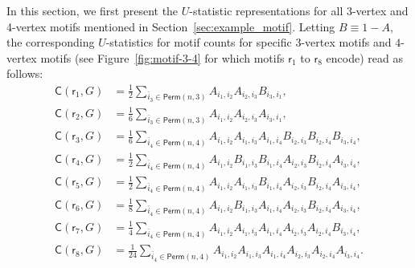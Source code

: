 \documentclass[sn-mathphys, natbib=false]{sn-jnl}
\theoremstyle{plain}
\theoremstyle{definition}
\def\sfr{\mathsf{r}}
\newcommand{\perm}[1]{\mathsf{Perm}(#1)}
\newcommand{\motifrg}[2]{\mathsf{C}(#1,#2)}
\begin{document}
\begin{bibunit}[agsm]
In this section, we first present the $U$-statistic representations for all 3-vertex and 4-vertex motifs mentioned in Section~\ref{sec:example_motif}. Letting $B \equiv 1 - A$, the corresponding $U$-statistics for motif counts for specific $3$-vertex motifs and $4$-vertex motifs (see Figure~\ref{fig:motif-3-4} for which motifs $\sfr_1$ to $\sfr_8$ encode) read as follows:
\begin{align*}
\motifrg{\sfr_1}{G} & = \frac{1}{2} \sum_{ \bar{i}_{3} \in \perm{n,3}}  A_{i_1, i_2} A_{i_2, i_3}  B_{i_3, i_1}, \\ \motifrg{\sfr_2}{G} & = \frac{1}{6} \sum_{ \bar{i}_{3} \in \perm{n,3}}  A_{i_1, i_2} A_{i_2, i_3} A_{i_3, i_1}, \\
\motifrg{\sfr_3}{G} & = \frac{1}{6} \sum_{ \bar{i}_{4} \in \perm{n,4}}  A_{i_1, i_2} A_{i_1, i_3} A_{i_1, i_4} B_{i_2, i_3} B_{i_2, i_4} B_{i_3, i_4}, \\ 
\motifrg{\sfr_4}{G} & = \frac{1}{2} \sum_{ \bar{i}_{4} \in \perm{n,4}}  A_{i_1, i_2} B_{i_1, i_3} B_{i_1, i_4} A_{i_2, i_3} B_{i_2, i_4} A_{i_3, i_4}, \\ 
\motifrg{\sfr_5}{G} & = \frac{1}{2} \sum_{ \bar{i}_{4} \in \perm{n,4}}  A_{i_1, i_2} A_{i_1, i_3} B_{i_1, i_4} A_{i_2, i_3} B_{i_2, i_4} A_{i_3, i_4}, \\ 
\motifrg{\sfr_6}{G} & = \frac{1}{8} \sum_{ \bar{i}_{4} \in \perm{n,4}}  A_{i_1, i_2} B_{i_1, i_3} A_{i_1, i_4} A_{i_2, i_3} B_{i_2, i_4} A_{i_3, i_4}, \\ 
\motifrg{\sfr_7}{G} & = \frac{1}{4} \sum_{ \bar{i}_{4} \in \perm{n,4}}  A_{i_1, i_2} A_{i_1, i_3} A_{i_1, i_4} A_{i_2, i_3} A_{i_2, i_4} B_{i_3, i_4}, \\ 
\motifrg{\sfr_8}{G} & = \frac{1}{24} \sum_{ \bar{i}_{4} \in \perm{n,4}}  A_{i_1, i_2} A_{i_1, i_3} A_{i_1, i_4} A_{i_2, i_3} A_{i_2, i_4} A_{i_3, i_4}.
\end{align*}


\begin{figure}[ht]
    \centering


\end{figure}
\end{bibunit}
\end{document}

